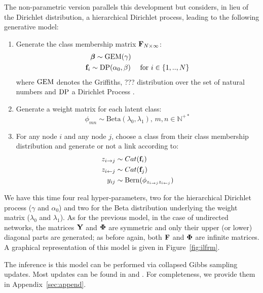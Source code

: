 The non-parametric version parallels this development but considers, in lieu of the Dirichlet distribution, a hierarchical Dirichlet process, leading to the following generative model:
%
\begin{enumerate}
\item Generate the class membership matrix $\mathbf{F}_{N \times \infty}$:
   \begin{align}
    &\bm{\beta} \sim \mathrm{GEM}(\gamma) \nonumber \\
    \mathbf{f}_i &\sim \mathrm{DP}(\alpha_0, \beta) \quad\textnormal{ for }  i \in \{1, .., N\} \nonumber
   \end{align}
where $\mathrm{GEM}$ denotes the Griffiths, ??? distribution over the set of natural numbers and $\mathrm{DP}$ a Dirichlet Process  \cite{HDP}.
\item Generate a weight matrix for each latent class:\\
\[ \phi_{mn} \sim \mathrm{Beta}(\lambda_0,\lambda_1), \, m,n \in \mathbb{N}^{+*} \]
\item For any node $i$ and any node $j$, choose a class from their class membership distribution and generate or not a link according to:
   \begin{align}
    z_{i \rightarrow j} &\sim \mbox{Cat}(\mat{f}_i) \nonumber \\
    z_{i \leftarrow j} &\sim \mbox{Cat}(\mat{f}_j) \nonumber \\
    y_{ij} &\sim \mathrm{Bern}(\phi_{z_{i \rightarrow j}z_{i \leftarrow j}})
    \label{eq:link-immsb}
   \end{align}
\end{enumerate}
%
We have this time four real hyper-parameters, two for the hierarchical Dirichlet process ($\gamma$ and $\alpha_0$) and two for the Beta distribution underlying the weight matrix ($\lambda_0$ and $\lambda_1$). As for the previous model, in the case of undirected networks, the matrices $\mathbf{Y}$ and $\mathbf{\Phi}$ are symmetric and only their upper (or lower) diagonal parts are generated; as before again, both $\mathbf{F}$ and $\mathbf{\Phi}$ are infinite matrices. A graphical representation of this model is given in Figure~\ref{fig:ilfrm}.

The inference is this model can be performed via collapsed Gibbs sampling updates. Most updates can be found in \cite{HDP} and \cite{diMMSB}. For completeness, we provide them in Appendix~\ref{sec:append}.

